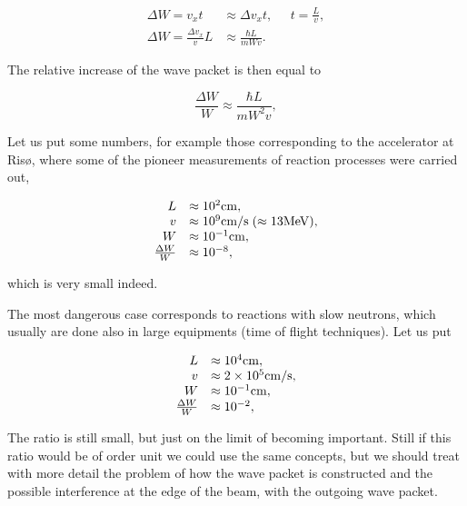 \begin{equation}
\begin{array}{rl}
\Delta W = v_x t &\approx \Delta v_x t, \;\;\;\;\; t = \frac{L}{v}, \\
\Delta W = \frac{\Delta v_x}{v} L &\approx \frac{\hbar L}{m W v}.
\end{array}
\end{equation}

\noindent The relative increase of the wave packet is then equal to

\begin{equation}
\frac{\Delta W}{W} \approx \frac{\hbar L}{m W^2 v},
\end{equation}

\noindent Let us put some numbers, for example those corresponding to the accelerator at Ris\o, where some of the pioneer measurements of reaction processes were carried out,

\begin{equation}
\begin{array}{rl}
L &\approx 10^2 {\rm cm}, \\
v &\approx 10^9 {\rm cm/s}\;(\approx 13 \text{MeV}), \\
W &\approx 10^{-1} {\rm cm}, \\
\frac{\Delta W}{W} &\approx 10^{-8},
\end{array}
\end{equation}

\noindent which is very small indeed.

The most dangerous case corresponds to reactions with slow neutrons, which usually are done also in large equipments (time of flight techniques). Let us put

\begin{equation}
\begin{array}{rl}
L &\approx 10^4 {\rm cm}, \\
v &\approx 2 \times 10^5 {\rm cm/s}, \\
W &\approx 10^{-1} {\rm cm}, \\
\frac{\Delta W}{W} &\approx 10^{-2},
\end{array}
\end{equation}

The ratio is still small, but just on the limit of becoming important. Still if this ratio would be of order unit we could use the same concepts, but we should treat with more detail the problem of how the wave packet is constructed and the possible interference at the edge of the beam, with the outgoing wave packet.

